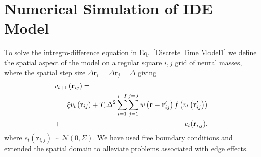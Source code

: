 \documentclass[twocolumn,11pt,a4paper]{article}		%
\begin{document}
\section{Numerical Simulation of IDE Model}\label{Space Discretization} To solve the intregro-difference equation in Eq.~\ref{Discrete Time Model1} we define the spatial aspect of the model on a regular square $i,j$ grid of neural masses, where the spatial step size $\Delta \mathbf{r}_i = \Delta \mathbf{r}_j = \Delta $ giving 
\begin{eqnarray}
	\label{discrete space} \lefteqn{v_{t+1}\left(\mathbf{r}_{ij}\right)=}\nonumber\\
&&\xi v_t\left(\mathbf{r}_{ij}\right)+T_s \Delta^2\sum_{i=1}^{i=I}{\sum_{j=1}^{j=J}{w\left(\mathbf{r}-\mathbf{r}_{ij}'\right)f\left( v_t\left( \mathbf{r}_{ij}'\right)\right)}}\nonumber\\
&+& e_t(\mathbf{r}_{i,j}), 
\end{eqnarray}
where $e_t(\mathbf{r}_{i,j}) \sim \mathcal{N}\left(0,\Sigma\right)$. We have used free boundary conditions and extended the spatial domain to alleviate problems associated with edge effects. 
\end{document}

